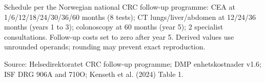 \begin{table}[H]
{\begin{threeparttable}
\begin{tablenotes}
\item Schedule per the Norwegian national CRC follow-up programme: CEA at 1/6/12/18/24/30/36/60 months (8 tests); CT lungs/liver/abdomen at 12/24/36 months (years 1 to 3); colonoscopy at 60 months (year 5); 2 specialist consultations. Follow-up costs set to zero after year 5. Derived values use unrounded operands; rounding may prevent exact reproduction.
\item Source: Helsedirektoratet CRC follow-up programme; DMP enhetskostnader v1.6; ISF DRG 906A and 710O; Kenseth et al. (2024) Table 1.
\end{tablenotes}
\end{threeparttable}
}
\end{table}
